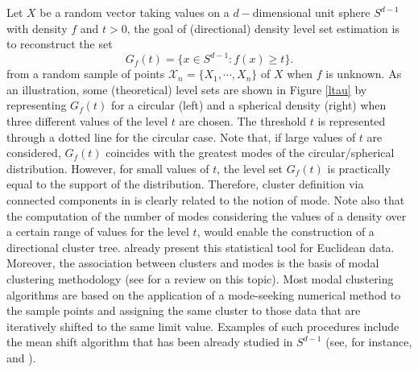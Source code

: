 Let $X$ be a random vector taking values on a $d-$dimensional unit sphere $S^{d-1}$ with density $f$ and $t>0$, the goal of (directional) density level set estimation is to reconstruct the set \begin{equation}\label{G(t)}
G_f(t)=\{x\in S^{d-1}:f(x)\geq t\}.
\end{equation}
from a random sample of points $\mathcal{X}_n= \{X_1,\cdots,X_n\}$ of $X$ when $f$ is unknown. As an illustration, some (theoretical) level sets are shown in Figure \ref{ltau} by representing $G_f(t)$ for a circular (left) and a spherical density (right) when three different values of the level $t$ are chosen. The threshold $t$ is represented through a dotted line for the circular case. Note that, if large values of $t$ are considered, $G_f(t)$ coincides with the greatest modes of the circular/spherical distribution. However, for small values of $t$, the level set $G_f(t)$ is practically equal to the support of the distribution. Therefore, cluster definition via  connected components in \cite{hartigan1975clustering} is clearly related to the notion of mode. Note also that the computation of the number of modes considering the values of a density over a certain range of values for the level $t$, would enable the construction of a directional cluster tree. \cite{azzalini2007clustering} already present this statistical tool for Euclidean data. Moreover, the association between clusters and modes is the basis of modal clustering methodology (see \citealp{menardi2016review} for a review on this topic). Most modal clustering algorithms are based on the application of a mode-seeking numerical method to the sample points and assigning the same cluster to those data that are iteratively shifted to the same limit value. Examples of such procedures include the mean shift algorithm that has been already studied in $S^{d-1}$ (see, for instance, \citealp{chang2010mean} and \citealp{yang2014mean}).

